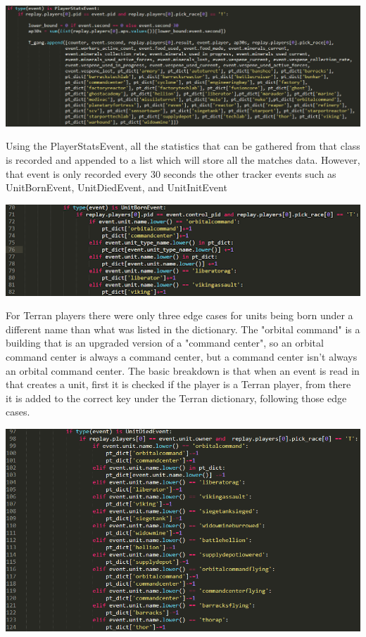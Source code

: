 \documentclass[a4paper,12pt]{report}
\begin{document}
\begin{center}
    \captionsetup{type=figure}
    \includegraphics[width=.9\linewidth]{media/TerranStatspystart.png}
\end{center}

Using the PlayerStatsEvent, all the statistics that can be gathered from that class is recorded and appended to a list which will store all the matches data. However, that event is only recorded every 30 seconds the other tracker events such as UnitBornEvent, UnitDiedEvent, and UnitInitEvent 

\begin{center}
    \captionsetup{type=figure}
    \includegraphics[width=.9\linewidth]{media/UnitBornDiedInit.png}
\end{center}

For Terran players there were only three edge cases for units being born under a different name than what was listed in the dictionary. The "orbital command" is a building that is an upgraded version of a "command center", so an orbital command center is always a command center, but a command center isn’t always an orbital command center. The basic breakdown is that when an event is read in that creates a unit, first it is checked if the player is a Terran player, from there it is added to the correct key under the Terran dictionary, following those edge cases.

\begin{center}
    \captionsetup{type=figure}
    \includegraphics[width=.9\linewidth]{media/EdgeCases.png}
\end{center}
\end{document}
